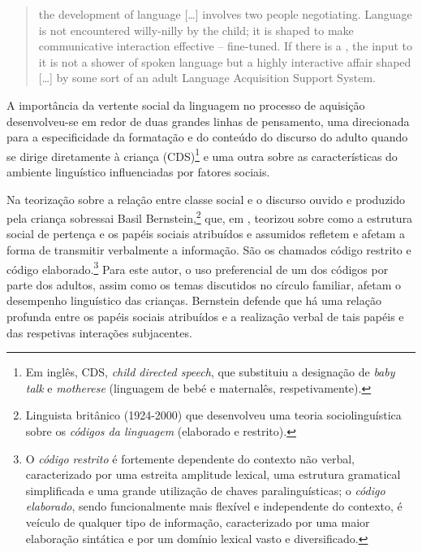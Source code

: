 \documentclass[output=paper]{LSP/langsci}
\begin{document}
\begin{quote}
the development of language [\ldots] involves two people negotiating. Language is not encountered willy-nilly by the child; it is shaped to make communicative interaction effective -- fine-tuned. If there is a , the input to it is not a shower of spoken language but a highly interactive affair shaped [\ldots] by some sort of an adult Language Acquisition Support System. \citep[39]{bruner1983}
\end{quote}

A importância da vertente social da linguagem no processo de aquisição de\-sen\-vol\-veu\x-se em redor de duas grandes linhas de pensamento, uma direcionada para a especificidade da formatação e do conteúdo do discurso do adulto quando se dirige diretamente à criança (CDS)\footnote{Em inglês, CDS, \emph{child directed speech}, que substituiu a designação de \emph{baby talk} e \emph{motherese} (linguagem de bebé e maternalês, respetivamente).} e uma outra sobre as características do ambiente linguístico influenciadas por fatores sociais. 

Na teorização sobre a relação entre classe social e o discurso ouvido e produzido pela criança sobressai Basil Bernstein,\footnote{Linguista britânico (1924-2000) que desenvolveu uma teoria sociolinguística sobre os \emph{códigos da linguagem} (elaborado e restrito).} que, em \citeyear{bernstein1971}, teorizou sobre como a estrutura social de pertença e os papéis sociais atribuídos e assumidos refletem e afetam a forma de transmitir verbalmente a informação. São os chamados código restrito e código elaborado.\footnote{O \textit{código restrito} é fortemente dependente do contexto não verbal, caracterizado por uma estreita amplitude lexical, uma estrutura gramatical simplificada e uma grande utilização de chaves paralinguísticas; o \textit{código elaborado}, sendo funcionalmente mais flexível e independente do contexto, é veículo de qualquer tipo de informação, caracterizado por uma maior elaboração sintática e por um domínio lexical vasto e diversificado. } Para este autor, o uso preferencial de um dos códigos por parte dos adultos, assim como os temas discutidos no círculo familiar, afetam o desempenho linguístico das crianças. Bernstein defende que há uma relação profunda entre os papéis sociais atribuídos e a realização verbal de tais papéis e das respetivas interações subjacentes.
\end{document}
